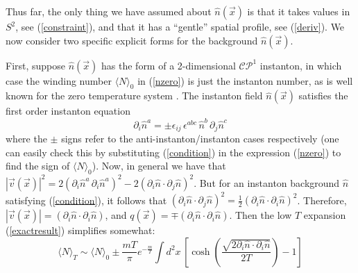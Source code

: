 \documentclass[a4paper,prd]{revtex4}
\begin{document}
Thus far, the only thing we have assumed about
$\hat{n}(\vec{x})$ is that it takes values in $ S^{2}$,  see
(\ref{constraint}), and that it has a ``gentle'' spatial profile, see
(\ref{deriv}). We now consider two specific explicit forms for the
background $\hat{n}(\vec{x})$. 

First, suppose $\hat{n}(\vec{x})$ has the form of a 2-dimensional
$\mathcal{CP}^{1}$ instanton, in which case the winding number $\langle
N\rangle_0$ in (\ref{nzero}) is just the instanton number, as is well
known for the zero temperature system \cite{raj}. 
The instanton field $\hat{n}(\vec{x})$ satisfies the
first order instanton equation
\begin{equation}
\partial_{i} \hat{n}^{a}=\pm \epsilon_{ij}\, \epsilon^{abc}\, \hat{n}^{b}\, 
\partial_{j} \hat{n}^{c}
\label{condition}
\end{equation}
where the $\pm$ signs refer to the anti-instanton/instanton cases
respectively (one can easily check this by substituting (\ref{condition})
in the expression (\ref{nzero}) to find the sign of  $\langle N \rangle
_0$). Now, in general we have that $|\vec{v}(\vec{x})|^2 =2(\partial_{i}
\hat{n}^{a}\,\partial_{i}\hat{n}^{a})^{2} -2(\partial_{i}\hat{n}\cdot  
\partial_{j}\hat{n})^{2}$. But for an instanton background $\hat{n}$
satisfying (\ref{condition}), it follows that
$(\partial_{i}\hat{n}\cdot\partial_{j}\hat{n})^{2}=\frac{1}{2}(\partial_{i}\hat{n}
\cdot \partial_{i}\hat{n})^{2}$. Therefore,
$|\vec{v}(\vec{x})|=(\partial_{i}\hat{n}\cdot \partial_{i}
\hat{n})$, and $q(\vec{x})=\mp (\partial_{i}\hat{n} \cdot  \partial_{i}
\hat{n})$. Then the low $T$ expansion (\ref{exactresult}) simplifies
somewhat:
\begin{equation}
\langle N\rangle _{T} \sim \langle N\rangle _{0} \pm 
\frac{m T}{\pi} e^{-\frac{m}{T}} \int d^{2}x\, \left[\cosh\left(\frac{\sqrt{2 \partial_{i}\hat{n}\cdot
\partial_{i} \hat{n}}}{2 T}\right)-1\right]
\label{instantonfn}
\end{equation}
\end{document}
